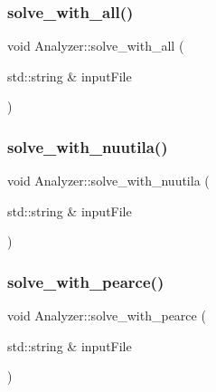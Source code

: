 \subsubsection{\texorpdfstring{solve\+\_\+with\+\_\+all()}{solve\_with\_all()}}
{\footnotesize\ttfamily void Analyzer\+::solve\+\_\+with\+\_\+all (\begin{DoxyParamCaption}\item[{std\+::string \&}]{input\+File }\end{DoxyParamCaption})}

\mbox{\label{class_analyzer_a5ac77dbb2bbea6b34af561272705d64e_a5ac77dbb2bbea6b34af561272705d64e}} 
\subsubsection{\texorpdfstring{solve\+\_\+with\+\_\+nuutila()}{solve\_with\_nuutila()}}
{\footnotesize\ttfamily void Analyzer\+::solve\+\_\+with\+\_\+nuutila (\begin{DoxyParamCaption}\item[{std\+::string \&}]{input\+File }\end{DoxyParamCaption})}

\mbox{\label{class_analyzer_a6009c58addbb9730b54580a5f01ddce7_a6009c58addbb9730b54580a5f01ddce7}} 
\subsubsection{\texorpdfstring{solve\+\_\+with\+\_\+pearce()}{solve\_with\_pearce()}}
{\footnotesize\ttfamily void Analyzer\+::solve\+\_\+with\+\_\+pearce (\begin{DoxyParamCaption}\item[{std\+::string \&}]{input\+File }\end{DoxyParamCaption})}

\mbox{\label{class_analyzer_a8207cd71986d26dc8abda1a807490ab2_a8207cd71986d26dc8abda1a807490ab2}} 
